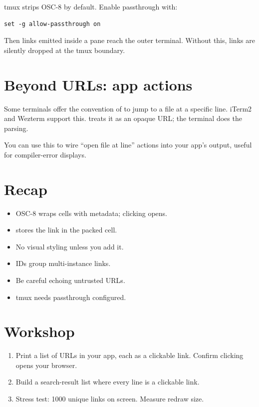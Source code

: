 tmux strips OSC-8 by default. Enable passthrough with:

\begin{lstlisting}
set -g allow-passthrough on
\end{lstlisting}

Then links emitted inside a pane reach the outer terminal.
Without this, links are silently dropped at the tmux boundary.

\section{Beyond URLs: app actions}

Some terminals offer the convention of 
to jump to a file at a specific line. iTerm2 and Wezterm
support this. \maya{} treats it as an opaque URL; the
terminal does the parsing.

You can use this to wire ``open file at line'' actions
into your app's output, useful for compiler-error displays.

\section{Recap}

\begin{recap}
\begin{itemize}[leftmargin=*]
  \item OSC-8 wraps cells with metadata; clicking opens.
  \item \maya{} stores the link in the packed cell.
  \item No visual styling unless you add it.
  \item IDs group multi-instance links.
  \item Be careful echoing untrusted URLs.
  \item tmux needs passthrough configured.
\end{itemize}
\end{recap}

\section*{Workshop}

\begin{enumerate}[leftmargin=*]
  \item Print a list of URLs in your app, each as a clickable
    link. Confirm clicking opens your browser.
  \item Build a search-result list where every line is a
    clickable  link.
  \item Stress test: 1000 unique links on screen. Measure
    redraw size.
\end{enumerate}
